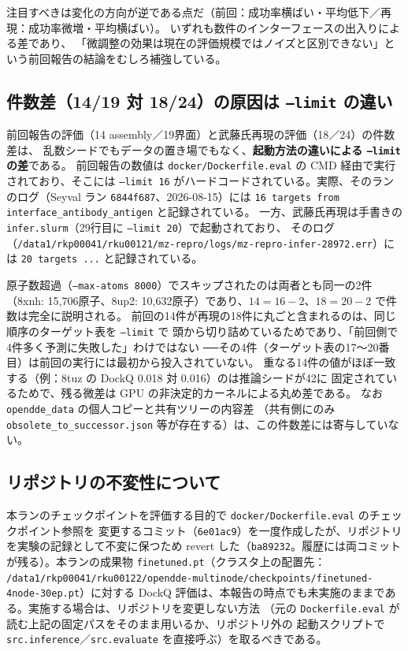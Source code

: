 \documentclass[11pt]{article}
\begin{document}
注目すべきは変化の方向が逆である点だ（前回：成功率横ばい・平均低下／再現：成功率微増・平均横ばい）。
いずれも数件のインターフェースの出入りによる差であり、
「微調整の効果は現在の評価規模ではノイズと区別できない」という前回報告の結論をむしろ補強している。

\subsection{件数差（14/19 対 18/24）の原因は \texttt{--limit} の違い}
\label{sec:limit}

前回報告の評価（14 assembly／19界面）と武藤氏再現の評価（18／24）の件数差は、
乱数シードでもデータの置き場でもなく、\textbf{起動方法の違いによる \texttt{--limit} の差}である。
前回報告の数値は \texttt{docker/Dockerfile.eval} の CMD 経由で実行されており、そこには
\texttt{--limit 16} がハードコードされている。実際、そのランのログ（Seyval ラン
\texttt{6844f687}、2026-08-15）には
\texttt{16 targets from interface\_antibody\_antigen} と記録されている。
一方、武藤氏再現は手書きの \texttt{infer.slurm}（29行目に \texttt{--limit 20}）で起動されており、
そのログ（\texttt{/data1/rkp00041/rku00121/mz-repro/logs/mz-repro-infer-28972.err}）には
\texttt{20 targets ...} と記録されている。

原子数超過（\texttt{--max-atoms 8000}）でスキップされたのは両者とも同一の2件
（8xnh: 15,706原子、8up2: 10,632原子）であり、$14 = 16 - 2$、$18 = 20 - 2$ で件数は完全に説明される。
前回の14件が再現の18件に丸ごと含まれるのは、同じ順序のターゲット表を \texttt{--limit} で
頭から切り詰めているためであり、「前回側で4件多く予測に失敗した」わけではない
──その4件（ターゲット表の17〜20番目）は前回の実行には最初から投入されていない。
重なる14件の値がほぼ一致する（例：8tuz の DockQ 0.018 対 0.016）のは推論シードが42に
固定されているためで、残る微差は GPU の非決定的カーネルによる丸め差である。
なお \texttt{opendde\_data} の個人コピーと共有ツリーの内容差
（共有側にのみ \texttt{obsolete\_to\_successor.json} 等が存在する）は、この件数差には寄与していない。

\subsection{リポジトリの不変性について}

本ランのチェックポイントを評価する目的で \texttt{docker/Dockerfile.eval} のチェックポイント参照を
変更するコミット（\texttt{6e01ac9}）を一度作成したが、リポジトリを実験の記録として不変に保つため
revert した（\texttt{ba89232}。履歴には両コミットが残る）。本ランの成果物
\texttt{finetuned.pt}（クラスタ上の配置先：
\texttt{/data1/rkp00041/rku00122/opendde-multinode/checkpoints/finetuned-4node-30ep.pt}）に対する
DockQ 評価は、本報告の時点でも未実施のままである。実施する場合は、リポジトリを変更しない方法
（元の \texttt{Dockerfile.eval} が読む上記の固定パスをそのまま用いるか、リポジトリ外の
起動スクリプトで \texttt{src.inference}／\texttt{src.evaluate} を直接呼ぶ）を取るべきである。
\end{document}
